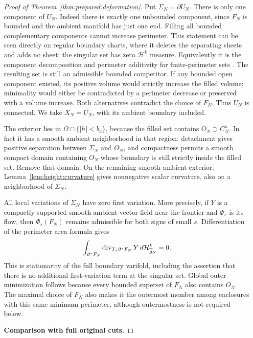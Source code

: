 \begin{proof}[Proof of Theorem~\ref{thm:prepared:deformation}]
Put $\Sigma_N=\partial U_N$.
There is only one component of $U_N$.  Indeed there is exactly one
unbounded component, since $F_N$ is bounded and the ambient manifold
has just one end.  Filling all bounded complementary components cannot
increase perimeter.  This statement can be seen directly on regular
boundary charts, where it deletes the separating sheets and adds no
sheet; the singular set has zero $\mathcal H^k$ measure.  Equivalently
it is the component decomposition and perimeter additivity for
finite-perimeter sets \cite{AFP}.  The resulting set is still an
admissible bounded competitor.  If any bounded open component existed,
its positive volume would strictly increase the filled volume; minimality
would either be contradicted by a perimeter decrease or preserved with
a volume increase.  Both alternatives contradict the choice of $F_N$.
Thus $U_N$ is connected.  We take $X_N=\overline{U_N}$, with its
ambient boundary included.

The exterior lies in $\Omega\cap\{|h|<b_3\}$, because the filled
set contains $O_N\supset C_N^h$.  In fact it has a smooth ambient
neighborhood in that region: detachment gives positive separation
between $\Sigma_N$ and $O_N$, and compactness permits a smooth compact
domain containing $O_N$ whose boundary is still strictly inside the
filled set.  Remove that domain.  On the remaining smooth ambient
exterior, Lemma~\ref{lem:height:curvature} gives nonnegative scalar
curvature, also on a neighborhood of $\Sigma_N$.

All local variations of $\Sigma_N$ have zero first variation.  More
precisely, if $Y$ is a compactly supported smooth ambient vector field
near the frontier and $\Phi_s$ is its flow, then $\Phi_s(F_N)$ remains
admissible for both signs of small $s$.  Differentiation of the perimeter
area formula gives
\begin{equation}\label{eq:height:weak-minimality}
 \int_{\partial^*F_N}\operatorname{div}_{T_x\partial^*F_N}Y\,
 d\mathcal H^k_{\widetilde g_N}=0.
\end{equation}
This is stationarity of the full boundary varifold, including the
assertion that there is no additional first-variation term at the
singular set.  Global outer minimization follows because every bounded
superset of $F_N$ also contains $O_N$.  The maximal choice of $F_N$
also makes it the outermost member among enclosures with this same
minimum perimeter, although outermostness is not required below.

\smallskip\noindent\textbf{Comparison with full original cuts.}\par\nopagebreak[4]


\end{proof}
